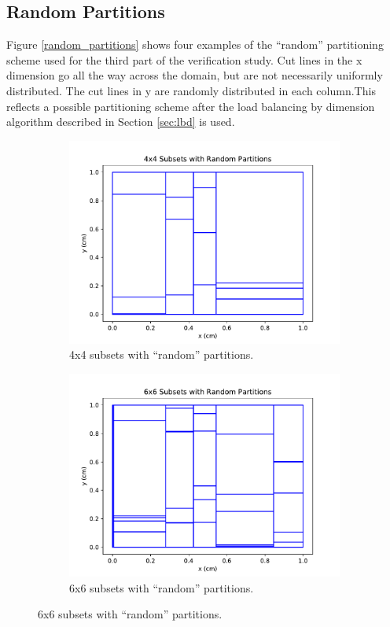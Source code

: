 \subsection{Random Partitions}
Figure \ref{random_partitions} shows four examples of the ``random'' partitioning scheme used for the third part of the verification study. Cut lines in the x dimension go all the way across the domain, but are not necessarily uniformly distributed. The cut lines in y are randomly distributed in each column.This reflects a possible partitioning scheme after the load balancing by dimension algorithm described in Section \ref{sec:lbd} is used.
\begin{figure}[H]
\centering
\begin{subfigure}[b]{0.45\textwidth}
  \includegraphics[width=\textwidth]{../cut_line_files/4_random.pdf}
  \caption{4x4 subsets with ``random'' partitions.}
  \label{4random}
\end{subfigure}
\begin{subfigure}[b]{0.45\textwidth}
  \includegraphics[width=\textwidth]{../cut_line_files/6_random.pdf}
  \caption{6x6 subsets with ``random'' partitions.}
  \label{6random}
\end{subfigure}


\end{figure}
